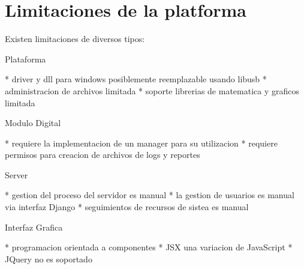 \section{Limitaciones de la platforma}


Existen limitaciones de diversos tipos:


Plataforma

* driver y dll para windows posiblemente reemplazable usando libusb
* administracion de archivos limitada
* soporte librerias de matematica y graficos limitada

Modulo Digital

* requiere la implementacion de un manager para su utilizacion
* requiere permisos para creacion de archivos de logs y reportes

Server

* gestion del proceso del servidor es manual
* la gestion de usuarios es manual via interfaz Django
* seguimientos de recursos de sistea es manual


Interfaz Grafica

* programacion orientada a componentes
* JSX una variacion de JavaScript
* JQuery no es soportado

